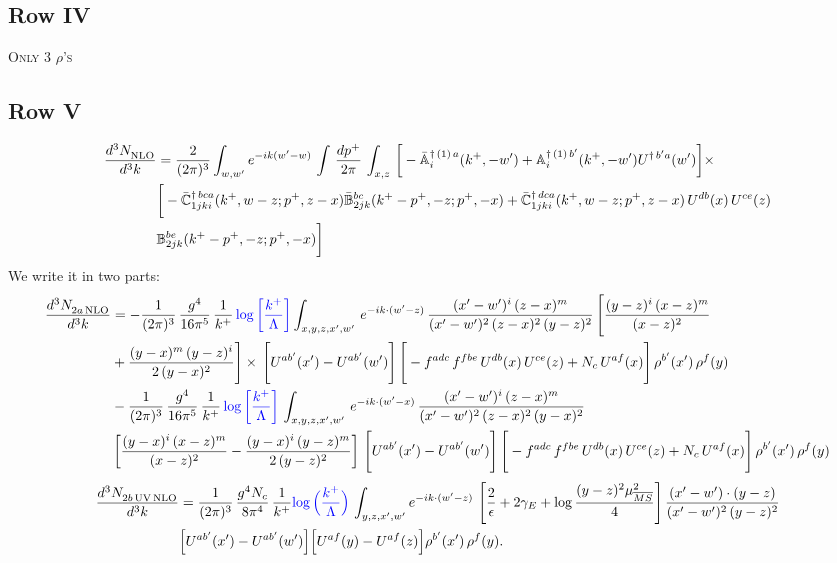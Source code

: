 \documentclass[9pt]{article}
\def\mf#1{\mathbb{#1}}
\numberwithin{equation}{section}
\begin{document}
\subsection{Row IV}
\textsc{Only 3 $\rho$'s}
\subsection{Row V}
\begin{align}
    \frac{d^{3}N_{\rm NLO}^{\rm}}{d^{3}k}  & = \frac{2}{(2\pi)^{3}}  \int_{w, w^\prime} e^{-ik(w^\prime-w)}\, \int\, \frac{dp^{+}}{2\pi}\,\int_{x,z}\, \bigg[-\bar{\mf{A}}^{\dagger\,(1)\,a}_{i}(k^{+},-w^{\prime})+\mf{A}^{\dagger\, (1)\, b^{\prime}}_{i}(k^{+},-w^{\prime})U^{\dagger\,b^{\prime}a}(w^{\prime})\bigg]\times\notag \\ & \bigg[-\Bar{\mf{C}}^{\dagger\, bca}_{1jki}(k^{+},w-z;p^{+},z-x)\Bar{\mf{B}}^{bc}_{2jk}(k^{+}-p^{+},- z;p^{+},-x)+\bar{\mf{C}}^{\dagger\, dca}_{1jki}(k^+,w-z; p^+, z-x)\,U^{db}(x)\,U^{ce}(z) \notag \\ & {\mf{B}}^{be}_{2jk} (k^{+}-p^+, -z; p^+, -x) \bigg]\nonumber
\end{align}
We write it in two parts: 
\begin{align}
    \frac{d^{3}N_{2a\,\rm NLO}^{\rm}}{d^{3}k}  & =   - \frac{1}{(2\pi)^{3}}\, \frac{g^{4}}{16\pi^{5}}\,\frac{1}{k^{+}}\,{\color{blue}\log{\left[\frac{k^{+}}{\Lambda}\right]}} \int_{x,y,z,x',w'}\, e^{-ik\cdot(w'-z)}\,\frac{(x'-w')^{i}\,(z-x)^{m}}{(x'-w')^{2}\,(z-x)^{2}\, (y-z)^{2}}\,\Bigg[\frac{(y-z)^{i}\,(x-z)^{m}}{(x-z)^{2}}\notag \\ & +\frac{(y-x)^{m}\,(y-z)^{i}}{2\,(y-x)^{2}}\Bigg]\times\, \Bigg[U^{ab'}(x')-U^{ab'}(w')\Bigg]\,\Bigg[-f^{adc}\,f^{fbe}\,U^{db}(x)\,U^{ce}(z)+N_{c}\,U^{af}(x)\Bigg]\,\rho^{b'}(x')\,\rho^{f}(y)\notag \\ & - \frac{1}{(2\pi)^{3}}\, \frac{g^{4}}{16\pi^{5}}\,\frac{1}{k^{+}}\,{\color{blue}\log{\left[\frac{k^{+}}{\Lambda}\right]}}\, \int_{x,y,z,x',w'}\,e^{-ik\cdot(w'-x)}\,\frac{(x'-w')^{i}\,(z-x)^{m}}{(x'-w')^{2}\,(z-x)^{2}\,(y-x)^{2}} \notag \\ &\left[\frac{(y-x)^{i}\,(x-z)^{m}}{(x-z)^{2}}-\frac{(y-x)^{i}\,(y-z)^{m}}{2\,(y-z)^{2}}\right]\, \Bigg[U^{ab'}(x')-U^{ab'}(w')\Bigg]\,\Bigg[-f^{adc}\,f^{fbe}\,U^{db}(x)\,U^{ce}(z)+N_{c}\,U^{af}(x)\Bigg]\,\rho^{b'}(x')\,\rho^{f}(y)
\end{align}
\begin{align}
\frac{d^{3}N_{2b\,\rm UV\, NLO}^{\rm}}{d^{3}k} & = \frac{1}{(2\pi)^{3}}\,\frac{g^{4}N_{c}}{8\pi^{4}}\,\frac{1}{k^{+}}
{\color{blue}\log\Big(\frac{k^{+}}{\Lambda}\Big)}\,\int_{y,z,x',w'}e^{-ik\cdot(w'-z)}\, \left[\frac{2}{\epsilon}+2\gamma_{E}+\log\frac{(y-z)^{2}\mu^{2}_{\overline{MS}}}{4}\right]
\frac{(x'-w')\cdot(y-z)}{(x'-w')^{2}\,(y-z)^{2}}\notag \\ &  \Big[U^{ab'}(x')-U^{ab'}(w')\Big]\Big[U^{af}(y)-U^{af}(z)\Big]\rho^{b'}(x')\,\rho^{f}(y).
\end{align}
\end{document}
